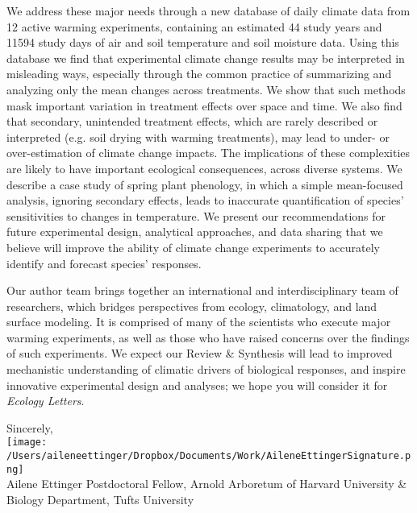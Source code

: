 \documentclass[11pt,a4paper]{letter}
\begin{document}
\begin{letter}{}
We address these major needs through a new database of daily climate data from 12 active warming experiments, containing an estimated 44 study years and 11594 study days of air and soil temperature and soil moisture data.  Using this database we find that experimental climate change results may be interpreted in misleading ways, especially through the common practice of summarizing and analyzing only the mean changes across treatments.  We show that such methods mask important variation in treatment effects over space and time. We also find that secondary, unintended treatment effects, which are rarely described or interpreted (e.g. soil drying with warming treatments), may lead to under- or over-estimation of climate change impacts. The implications of these complexities are likely to have important ecological consequences, across diverse systems. We describe a case study of spring plant phenology, in which a simple mean-focused analysis, ignoring secondary effects, leads to inaccurate quantification of species' sensitivities to changes in temperature. We present our recommendations for future experimental design, analytical approaches, and data sharing that we believe will improve the ability of climate change experiments to accurately identify and forecast species' responses.

Our author team brings together an international and interdisciplinary team of researchers, which bridges perspectives from ecology, climatology, and land surface modeling. It is comprised of many of the scientists who execute major warming experiments, as well as those who have raised concerns over the findings of such experiments.  We expect our Review \& Synthesis will lead to improved mechanistic understanding of climatic drivers of biological responses, and inspire innovative experimental design and analyses; we hope you will consider it for \emph{Ecology Letters}.

Sincerely,\\

\texttt{[image: /Users/aileneettinger/Dropbox/Documents/Work/AileneEttingerSignature.png]} \\
Ailene Ettinger
Postdoctoral Fellow, Arnold Arboretum of Harvard University \& Biology Department, Tufts University


\end{letter}
\end{document}
